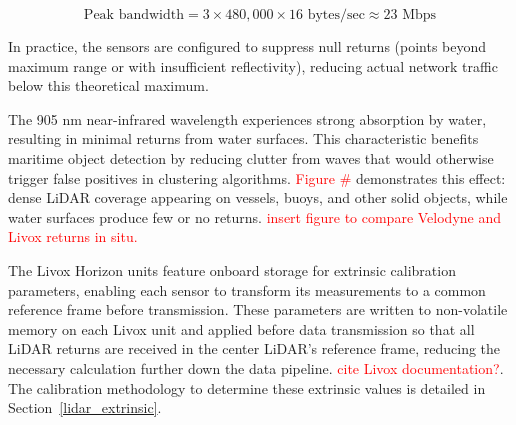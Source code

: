 $$\text{Peak bandwidth} = 3 \times 480,000 \times 16 \text{ bytes/sec} \approx 23 \text{ Mbps}$$

In practice, the sensors are configured to suppress null returns (points beyond maximum range or with insufficient reflectivity), reducing actual network traffic below this theoretical maximum.

The 905 nm near-infrared wavelength experiences strong absorption by water, resulting in minimal returns from water surfaces.
This characteristic benefits maritime object detection by reducing clutter from waves that would otherwise trigger false positives in clustering algorithms.
\textcolor{red}{Figure \#} demonstrates this effect: dense \ac{LiDAR} coverage appearing on vessels, buoys, and other solid objects, while water surfaces produce few or no returns.
\textcolor{red}{insert figure to compare Velodyne and Livox returns in situ.}








The Livox Horizon units feature onboard storage for extrinsic calibration parameters, enabling each sensor to transform its measurements to a common reference frame before transmission.
These parameters are written to non-volatile memory on each Livox unit and applied before data transmission so that all LiDAR returns are received in the center \ac{LiDAR}'s reference frame, reducing the necessary calculation further down the data pipeline.
\textcolor{red}{cite Livox documentation?}.
The calibration methodology to determine these extrinsic values is detailed in Section~\ref{lidar_extrinsic}.


